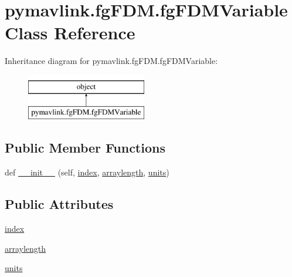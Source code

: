 \hypertarget{classpymavlink_1_1fgFDM_1_1fgFDMVariable}{}\section{pymavlink.\+fg\+F\+D\+M.\+fg\+F\+D\+M\+Variable Class Reference}
\label{classpymavlink_1_1fgFDM_1_1fgFDMVariable}
Inheritance diagram for pymavlink.\+fg\+F\+D\+M.\+fg\+F\+D\+M\+Variable\+:\begin{figure}[H]
\begin{center}
\leavevmode
\includegraphics[height=2.000000cm]{classpymavlink_1_1fgFDM_1_1fgFDMVariable}
\end{center}
\end{figure}
\subsection*{Public Member Functions}
\begin{DoxyCompactItemize}
\item 
def \mbox{\hyperlink{classpymavlink_1_1fgFDM_1_1fgFDMVariable_a78133d155a96ae5e4179b2303b4fac54}{\+\_\+\+\_\+init\+\_\+\+\_\+}} (self, \mbox{\hyperlink{classpymavlink_1_1fgFDM_1_1fgFDMVariable_a700fa75ac67b10effc7ff492ec16972e}{index}}, \mbox{\hyperlink{classpymavlink_1_1fgFDM_1_1fgFDMVariable_a2b1ccbcc1383da3cbb74593594acd483}{arraylength}}, \mbox{\hyperlink{classpymavlink_1_1fgFDM_1_1fgFDMVariable_a7c4d651947e6e5c81957da2c277d080f}{units}})
\end{DoxyCompactItemize}
\subsection*{Public Attributes}
\begin{DoxyCompactItemize}
\item 
\mbox{\hyperlink{classpymavlink_1_1fgFDM_1_1fgFDMVariable_a700fa75ac67b10effc7ff492ec16972e}{index}}
\item 
\mbox{\hyperlink{classpymavlink_1_1fgFDM_1_1fgFDMVariable_a2b1ccbcc1383da3cbb74593594acd483}{arraylength}}
\item 
\mbox{\hyperlink{classpymavlink_1_1fgFDM_1_1fgFDMVariable_a7c4d651947e6e5c81957da2c277d080f}{units}}
\end{DoxyCompactItemize}


